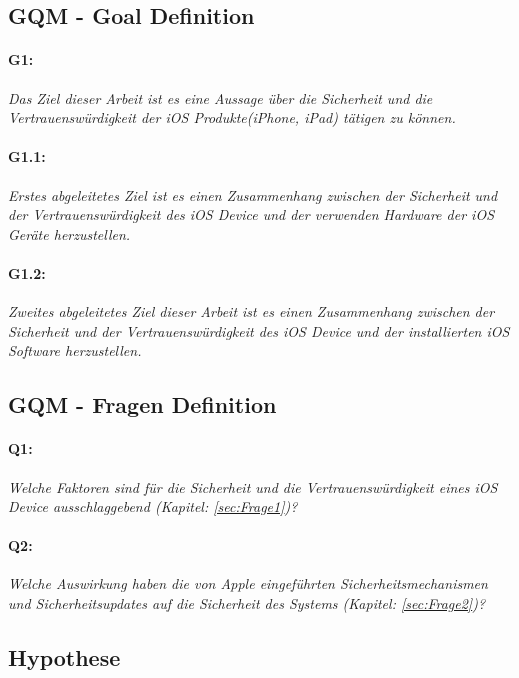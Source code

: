 \subsection{GQM - Goal Definition}
\label{sec:GQMGoal}

\paragraph{G1:} \textit{\glqq Das Ziel dieser Arbeit ist es eine Aussage über die Sicherheit und die Vertrauenswürdigkeit der iOS Produkte(iPhone, iPad) tätigen zu können.\grqq{}}
\paragraph{G1.1:} \textit{\glqq Erstes abgeleitetes Ziel ist es einen Zusammenhang zwischen der Sicherheit und der Vertrauenswürdigkeit des iOS Device und der verwenden Hardware der iOS Geräte herzustellen.\grqq{}}

\paragraph{G1.2:} \textit{\glqq Zweites abgeleitetes Ziel dieser Arbeit ist es einen Zusammenhang zwischen der Sicherheit und der Vertrauenswürdigkeit des iOS Device und der installierten iOS Software herzustellen.\grqq{}}

\subsection{GQM - Fragen Definition}
\label{sec:GQMFragen}

\paragraph{Q1:} \textit{\glqq Welche Faktoren sind für die Sicherheit und die Vertrauenswürdigkeit eines iOS Device ausschlaggebend (Kapitel: \ref{sec:Frage1})?\grqq{}}
                    
 \paragraph{Q2:} \textit{\glqq Welche Auswirkung haben die von Apple eingeführten Sicherheitsmechanismen und Sicherheitsupdates auf die Sicherheit des Systems (Kapitel: \ref{sec:Frage2})?\grqq{}}
        
\subsection{Hypothese}
\label{sec:GQMHypothese}
